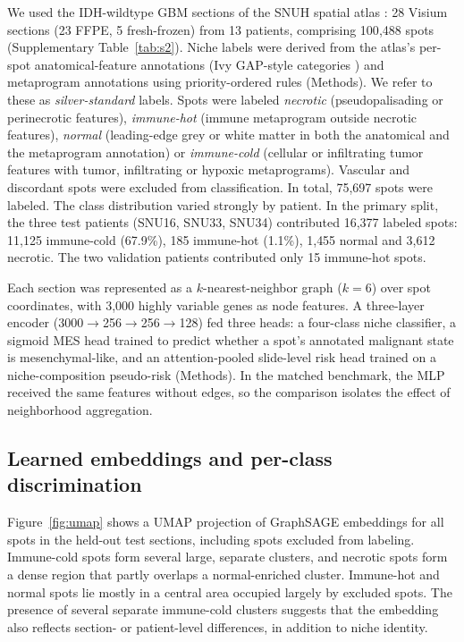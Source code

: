 \documentclass[11pt,letterpaper]{article}
\begin{document}
We used the IDH-wildtype GBM sections of the SNUH spatial atlas \cite{park2026}: 28 Visium sections (23 FFPE, 5 fresh-frozen) from 13 patients, comprising 100{,}488 spots (Supplementary Table~\ref{tab:s2}). Niche labels were derived from the atlas's per-spot anatomical-feature annotations (Ivy GAP-style categories \cite{puchalski2018}) and metaprogram annotations using priority-ordered rules (Methods). We refer to these as \emph{silver-standard} labels. Spots were labeled \emph{necrotic} (pseudopalisading or perinecrotic features), \emph{immune-hot} (immune metaprogram outside necrotic features), \emph{normal} (leading-edge grey or white matter in both the anatomical and the metaprogram annotation) or \emph{immune-cold} (cellular or infiltrating tumor features with tumor, infiltrating or hypoxic metaprograms). Vascular and discordant spots were excluded from classification. In total, 75{,}697 spots were labeled. The class distribution varied strongly by patient. In the primary split, the three test patients (SNU16, SNU33, SNU34) contributed 16{,}377 labeled spots: 11{,}125 immune-cold (67.9\%), 185 immune-hot (1.1\%), 1{,}455 normal and 3{,}612 necrotic. The two validation patients contributed only 15 immune-hot spots.

Each section was represented as a $k$-nearest-neighbor graph ($k = 6$) over spot coordinates, with 3{,}000 highly variable genes as node features. A three-layer encoder (3000$\rightarrow$256$\rightarrow$256$\rightarrow$128) fed three heads: a four-class niche classifier, a sigmoid MES head trained to predict whether a spot's annotated malignant state is mesenchymal-like, and an attention-pooled slide-level risk head trained on a niche-composition pseudo-risk (Methods). In the matched benchmark, the MLP received the same features without edges, so the comparison isolates the effect of neighborhood aggregation.

\subsection{Learned embeddings and per-class discrimination}

Figure~\ref{fig:umap} shows a UMAP \cite{mcinnes2018} projection of GraphSAGE embeddings for all spots in the held-out test sections, including spots excluded from labeling. Immune-cold spots form several large, separate clusters, and necrotic spots form a dense region that partly overlaps a normal-enriched cluster. Immune-hot and normal spots lie mostly in a central area occupied largely by excluded spots. The presence of several separate immune-cold clusters suggests that the embedding also reflects section- or patient-level differences, in addition to niche identity.
\end{document}
